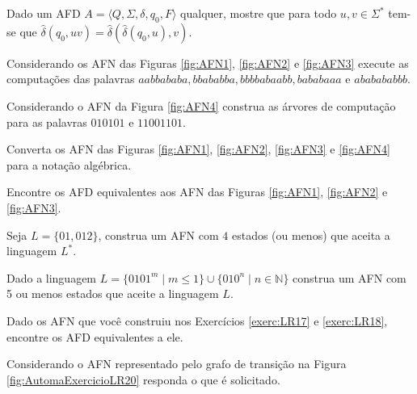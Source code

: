 \begin{exercise}\label{exerc:LR12}
	Dado um AFD $A = \langle Q, \Sigma, \delta, q_0, F\rangle$ qualquer, mostre que para todo $u,v \in \Sigma^*$ tem-se que $\widehat{\delta}(q_0, uv) = \widehat{\delta}(\widehat{\delta}(q_0, u), v)$.
\end{exercise}

\begin{exercise}\label{exerc:LR13}
	Considerando os AFN das Figuras  \ref{fig:AFN1}, \ref{fig:AFN2} e \ref{fig:AFN3} execute as computações das palavras $aabbababa, bbababba, bbbbabaabb, bababaaa$ e $ababababbb$.
\end{exercise}

\begin{exercise}\label{exerc:LR14}
	Considerando o AFN da Figura  \ref{fig:AFN4} construa as árvores de computação para as palavras $010101$ e $11001101$.
\end{exercise}


\begin{exercise}\label{exerc:LR15}
	Converta os AFN das Figuras  \ref{fig:AFN1}, \ref{fig:AFN2}, \ref{fig:AFN3} e \ref{fig:AFN4} para a notação algébrica.
\end{exercise}

\begin{exercise}\label{exerc:LR16}
	Encontre os AFD equivalentes aos AFN das Figuras  \ref{fig:AFN1}, \ref{fig:AFN2} e \ref{fig:AFN3}.
\end{exercise}

\begin{exercise}\label{exerc:LR17}
	Seja $L = \{01, 012\}$, construa um AFN com $4$ estados (ou menos)  que aceita a linguagem $L^*$.
\end{exercise}

\begin{exercise}\label{exerc:LR18}
	Dado a linguagem $L = \{0101^m \mid m \leq 1\} \cup \{010^n \mid n \in \mathbb{N}\}$ construa um AFN com 5 ou menos estados que aceite a linguagem $L$.
\end{exercise}

\begin{exercise}\label{exerc:LR19}
	Dado os AFN que você construiu nos Exercícios \ref{exerc:LR17} e \ref{exerc:LR18}, encontre os AFD equivalentes a ele.
\end{exercise}

\begin{exercise}\label{exerc:LR20}
	Considerando o AFN representado pelo grafo de transição na Figura \ref{fig:AutomaExercicioLR20} responda o que é solicitado.
\end{exercise}

